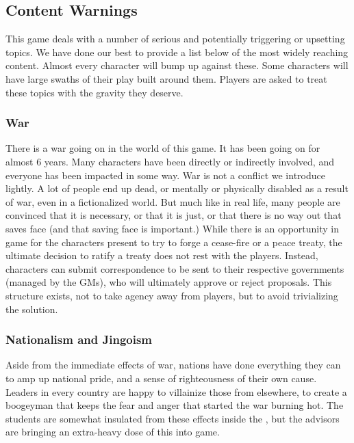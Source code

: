 \documentclass[sheet]{GL2020}
\begin{document}
\subsection{Content Warnings}
This game deals with a number of serious and potentially triggering or upsetting topics. We have done our best to provide a list below of the most widely reaching content. Almost every character will bump up against these. Some characters will have large swaths of their play built around them. Players are asked to treat these topics with the gravity they deserve.

\subsubsection{War}
There is a war going on in the world of this game. It has been going on for almost 6 years. Many characters have been directly or indirectly involved, and everyone has been impacted in some way. War is not a conflict we introduce lightly. A lot of people end up dead, or mentally or physically disabled as a result of war, even in a fictionalized world. But much like in real life, many people are convinced that it is necessary, or that it is just, or that there is no way out that saves face (and that saving face is important.) While there is an opportunity in game for the characters present to try to forge a cease-fire or a peace treaty, the ultimate decision to ratify a treaty does not rest with the players. Instead, characters can submit correspondence to be sent to their respective governments (managed by the GMs), who will ultimately approve or reject proposals. This structure exists, not to take agency away from players, but to avoid trivializing the solution. 

\subsubsection{Nationalism and Jingoism}
Aside from the immediate effects of war, nations have done everything they can to amp up national pride, and a sense of righteousness of their own cause. Leaders in every country are happy to villainize those from elsewhere, to create a boogeyman that keeps the fear and anger that started the war burning hot. The students are somewhat insulated from these effects inside the \pSchool{}, but the advisors are bringing an extra-heavy dose of this into game.
\end{document}
